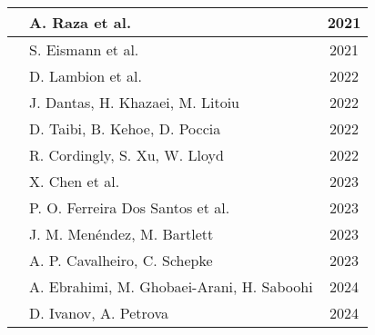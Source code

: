 \begin{table}[!ht]
\begin{tabular}{|c|l|c|}
    \hline
    \cite{raza2021sok} & A. Raza et al. & 2021 \\
    \hline
    \cite{eismann2021reviewserverlessusecases} & S. Eismann et al. & 2021 \\
    \hline
    \cite{10.1145/3491204.3543506} & D. Lambion et al. & 2022 \\
    \hline
    \cite{9860368} & J. Dantas, H. Khazaei, M. Litoiu & 2022 \\
    \hline
    \cite{9912641} & D. Taibi, B. Kehoe, D. Poccia & 2022 \\
    \hline
    \cite{9946331} & R. Cordingly, S. Xu, W. Lloyd & 2022 \\
    \hline
    \cite{10.1145/3631295.3631394} & X. Chen et al. & 2023 \\
    \hline
    \cite{FerreiraDosSantos2023} & P. O. Ferreira Dos Santos et al. & 2023 \\
    \hline
    \cite{menéndez2023performancebestpracticesusing} & J. M. Menéndez, M. Bartlett & 2023 \\
    \hline
    \cite{Cavalheiro202389} & A. P. Cavalheiro, C. Schepke & 2023 \\
    \hline
    \cite{EBRAHIMI2024103115} & A. Ebrahimi, M. Ghobaei-Arani, H. Saboohi & 2024 \\
    \hline
    \cite{Ivanov_Petrova_2024} & D. Ivanov, A. Petrova & 2024 \\
    \hline
    \end{tabular}
    \label{table:research_papers_results}
\end{table}

